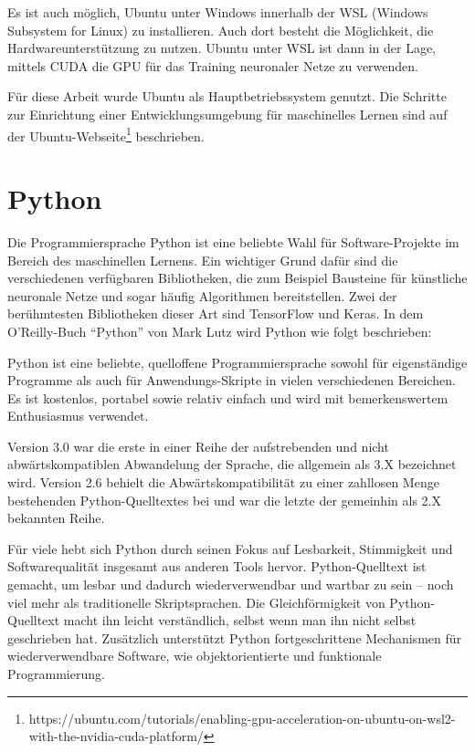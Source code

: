 Es ist auch möglich, Ubuntu unter Windows innerhalb der WSL (Windows Subsystem for Linux) zu installieren. Auch dort besteht die Möglichkeit, die Hardwareunterstützung zu nutzen. Ubuntu unter WSL ist dann in der Lage, mittels CUDA die GPU für das Training neuronaler Netze zu verwenden.

Für diese Arbeit wurde Ubuntu als Hauptbetriebssystem genutzt. Die Schritte zur Einrichtung einer Entwicklungsumgebung für maschinelles Lernen sind auf der Ubuntu-Webseite\footnote{https://ubuntu.com/tutorials/enabling-gpu-acceleration-on-ubuntu-on-wsl2-with-the-nvidia-cuda-platform/} beschrieben.

\section{Python}
\label{sec:python}
Die Programmiersprache Python ist eine beliebte Wahl für Software-Projekte im Bereich des maschinellen Lernens. Ein wichtiger Grund dafür sind die verschiedenen verfügbaren Bibliotheken, die zum Beispiel Bausteine für künstliche neuronale Netze und sogar häufig Algorithmen bereitstellen. Zwei der berühmtesten Bibliotheken dieser Art sind TensorFlow und Keras. In dem O'Reilly-Buch ``Python'' von Mark Lutz \cite{lutz2013python} wird Python wie folgt beschrieben:

Python ist eine beliebte, quelloffene Programmiersprache sowohl für eigenständige Programme als auch für Anwendungs-Skripte in vielen verschiedenen Bereichen. Es ist kostenlos, portabel sowie relativ einfach und wird  mit bemerkenswertem Enthusiasmus verwendet.

Version 3.0 war die erste in einer Reihe der aufstrebenden und nicht abwärtskompatiblen Abwandelung der Sprache, die allgemein als 3.X bezeichnet wird. Version 2.6 behielt die Abwärtskompatibilität zu einer zahllosen Menge bestehenden Python-Quelltextes bei und war die letzte der gemeinhin als 2.X bekannten Reihe.

Für viele hebt sich Python durch seinen Fokus auf Lesbarkeit, Stimmigkeit und Softwarequalität insgesamt aus anderen Tools hervor. Python-Quelltext ist gemacht, um lesbar und dadurch wiederverwendbar und wartbar zu sein -- noch viel mehr als traditionelle Skriptsprachen. Die Gleichförmigkeit von Python-Quelltext macht ihn leicht verständlich, selbst wenn man ihn nicht selbst geschrieben hat. Zusätzlich unterstützt Python fortgeschrittene Mechanismen für wiederverwendbare Software, wie objektorientierte und funktionale Programmierung.

